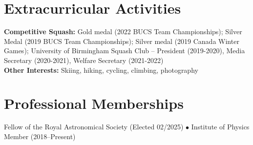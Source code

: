 \documentclass[11pt,a4paper]{article}
\begin{document}
\section*{Extracurricular Activities}
\par\noindent\hspace{1.5em}%
\begin{minipage}[t]{\dimexpr\textwidth-1.5em\relax}
\textbf{Competitive Squash:} Gold medal (2022 BUCS Team Championships); Silver Medal (2019 BUCS Team Championships); Silver medal (2019 Canada Winter Games); University of Birmingham Squash Club -- President (2019-2020), Media Secretary (2020-2021), Welfare Secretary (2021-2022) \\

\noindent\textbf{Other Interests:} Skiing, hiking, cycling, climbing, photography
\end{minipage}\par
\vspace{0.5em}

\section*{Professional Memberships}
\par\noindent\hspace{1.5em}%
\begin{minipage}[t]{\dimexpr\textwidth-1.5em\relax}
Fellow of the Royal Astronomical Society (Elected 02/2025) $\bullet$ Institute of Physics Member (2018--Present)
\end{minipage}\par
\vspace{0.5em}

\label{LastPage}
\end{document}
